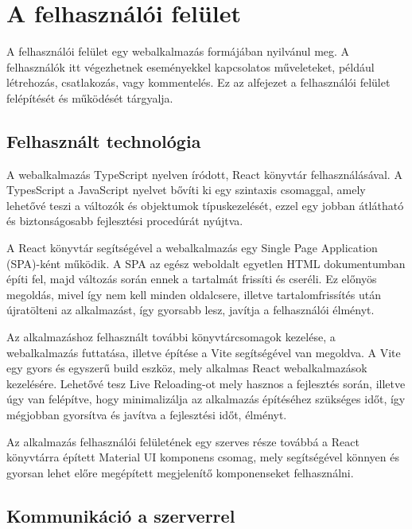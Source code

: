 \section{A felhasználói felület}

A felhasználói felület egy webalkalmazás formájában nyilvánul meg. A felhasználók itt végezhetnek eseményekkel kapcsolatos műveleteket, például létrehozás, csatlakozás, vagy kommentelés. Ez az alfejezet a felhasználói felület felépítését és működését tárgyalja.

\subsection{Felhasznált technológia}

A webalkalmazás TypeScript nyelven íródott, React könyvtár felhasználásával.
A TypesScript a JavaScript nyelvet bővíti ki egy szintaxis csomaggal, amely lehetővé teszi a változók és objektumok típuskezelését, ezzel egy jobban átlátható és biztonságosabb fejlesztési procedúrát nyújtva.

A React könyvtár segítségével a webalkalmazás egy Single Page Application (SPA)-ként működik.
A SPA az egész weboldalt egyetlen HTML dokumentumban építi fel, majd változás során ennek a tartalmát frissíti és cseréli. Ez előnyös megoldás, mivel így nem kell minden oldalcsere, illetve tartalomfrissítés után újratölteni az alkalmazást, így gyorsabb lesz, javítja a felhasználói élményt.

Az alkalmazáshoz felhasznált további könyvtárcsomagok kezelése, a webalkalmazás futtatása, illetve építése a Vite segítségével van megoldva.
A Vite egy gyors és egyszerű build eszköz, mely alkalmas React webalkalmazások kezelésére. Lehetővé tesz Live Reloading-ot mely hasznos a fejlesztés során, illetve úgy van felépítve, hogy minimalizálja az alkalmazás építéséhez szükséges időt, így mégjobban gyorsítva és javítva a fejlesztési időt, élményt.

Az alkalmazás felhasználói felületének egy szerves része továbbá a React könyvtárra épített Material UI komponens csomag, mely segítségével könnyen és gyorsan lehet előre megépített megjelenítő komponenseket felhasználni.

\subsection{Kommunikáció a szerverrel}


